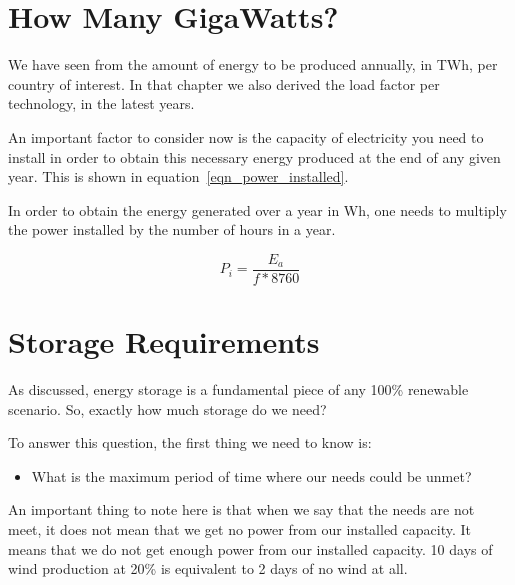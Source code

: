 \section{How Many GigaWatts?}

We have seen from  the amount of energy to be produced annually, in TWh, per country of interest. In that chapter we also derived the load factor per technology, in the latest years.


An important factor to consider now is the capacity of electricity you need to install in order to obtain this necessary energy produced at the end of any given year. This is shown in equation~\ref{eqn_power_installed}.

\begin{remark}
In order to obtain the energy generated over a year in Wh, one needs to multiply the power installed by the number of hours in a year.

\begin{equation}\label{eqn_power_installed}
P_i = \frac{E_a}{f * 8760}
\end{equation}

\end{remark}

\section{Storage Requirements}

As discussed, energy storage is a fundamental piece of any 100\% renewable scenario. So, exactly how much storage do we need?

To answer this question, the first thing we need to know is:

\begin{itemize}
\item What is the maximum period of time where our needs could be unmet?
\end{itemize}

An important thing to note here is that when we say that the needs are not meet, it does not mean that we get no power from our installed capacity. It means that we do not get enough power from our installed capacity. 10 days of wind production at 20\% is equivalent to 2 days of no wind at all.

